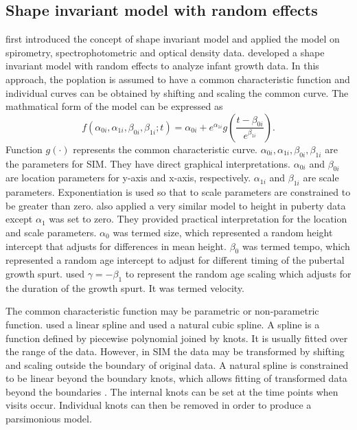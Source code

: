 \documentclass{article}
\numberwithin{equation}{section}
\begin{document}
\subsection{Shape invariant model with random effects}
\cite{lawton1972self} first introduced the concept of shape invariant model and applied the model on spirometry, spectrophotometric and optical density data. \cite{beath2007infant} developed a shape invariant model with random effects to analyze infant growth data. In this approach, the poplation is assumed to have a common characteristic function and individual curves can be obtained by shifting and scaling the common curve. The mathmatical form of the model can be expressed as 
\begin{equation}
f(\alpha_{0i},\alpha_{1i},\beta_{0i},\beta_{1i};t) = \alpha_{0i}+e^{\alpha_{1i}}g\left(\frac{t-\beta_{0i}}{e^{\beta_{1i}}}\right).
\end{equation}
Function $g(\cdot)$ represents the common characteristic curve. $\alpha_{0i},\alpha_{1i},\beta_{0i},\beta_{1i}$ are the parameters for SIM. They have direct graphical interpretations. $\alpha_{0i}$ and $\beta_{0i}$ are location parameters for y-axis and x-axis, respectively. $\alpha_{1i}$ and $\beta_{1i}$ are scale parameters. Exponentiation is used so that to scale parameters are constrained to be greater than zero. \cite{cole2010sitar} also applied a very similar model to height in puberty data except $\alpha_{1}$ was set to zero. They provided practical interpretation for the location and scale parameters. $\alpha_{0}$ was termed size, which represented a random height intercept that adjusts for differences in mean height. $\beta_{0}$ was termed tempo, which represented a random age intercept to adjust for different timing of the pubertal growth spurt. \cite{cole2010sitar} used $\gamma=-\beta_{1}$ to represent the random age scaling which adjusts for the duration of the growth spurt. It was termed velocity. 


The common characteristic function may be parametric or non-parametric function. \cite{lawton1972self} used a linear spline and \cite{beath2007infant} used a natural cubic spline. A spline is a function defined by piecewise polynomial joined by knots. It is usually fitted over the range of the data. However, in SIM the data may be transformed by shifting and scaling outside the boundary of original data. A natural spline is constrained to be
linear beyond the boundary knots, which allows fitting of transformed data beyond the boundaries \cite{beath2007infant}. The internal knots can be set at the time points when visits occur. Individual knots can then be removed in order to produce a parsimonious model.
\end{document}
